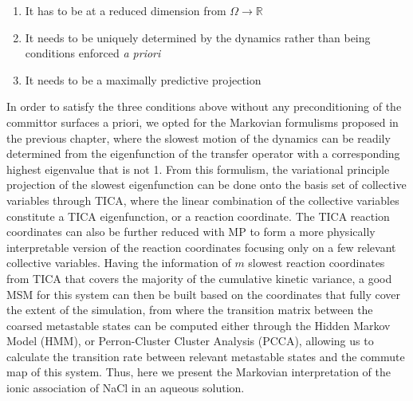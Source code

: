 \begin{spacing}{2.0}
    \begin{enumerate}
        \item{It has to be at a reduced dimension from $\Omega \to \mathbb{R}$}
        \item{It needs to be uniquely determined by the dynamics rather than being conditions enforced \textsl{a priori}}
        \item{It needs to be a maximally predictive projection}
    \end{enumerate}

    In order to satisfy the three conditions above without any preconditioning of the committor surfaces a priori, we opted for the Markovian 
    formulisms proposed in the previous chapter, where the slowest motion of the dynamics can be readily determined from the eigenfunction of the 
    transfer operator with a corresponding highest eigenvalue that is not 1. From this formulism, the variational principle projection of the 
    slowest eigenfunction can be done onto the basis set of collective variables through TICA, where the linear combination of the collective 
    variables constitute a TICA eigenfunction, or a reaction coordinate. The TICA reaction coordinates can also be further reduced with MP to form 
    a more physically interpretable version of the reaction coordinates focusing only on a few relevant collective variables. Having the 
    information of $m$ slowest reaction coordinates from TICA that covers the majority of the cumulative kinetic variance, a good MSM for this 
    system can then be built based on the coordinates that fully cover the extent of the simulation, from where the transition matrix between the 
    coarsed metastable states can be computed either through the Hidden Markov Model (HMM), or Perron-Cluster Cluster Analysis (PCCA), allowing us 
    to calculate the transition rate between relevant metastable states and the commute map of this system. Thus, here we present the Markovian 
    interpretation of the ionic association of NaCl in an aqueous solution.
\end{spacing}
